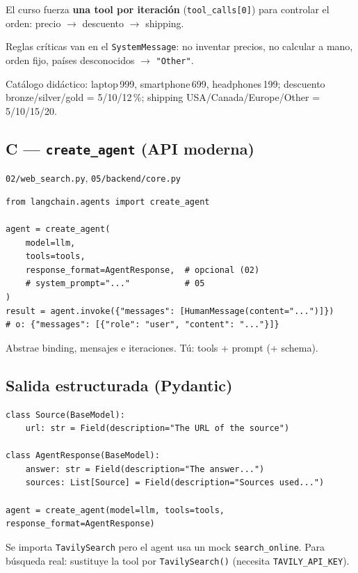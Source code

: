 \documentclass[11pt,a4paper]{article}
\begin{document}
El curso fuerza \textbf{una tool por iteración} (\texttt{tool\_calls[0]}) para controlar el orden: precio $\to$ descuento $\to$ shipping.

Reglas críticas van en el \texttt{SystemMessage}: no inventar precios, no calcular a mano, orden fijo, países desconocidos $\to$ \texttt{"Other"}.

Catálogo didáctico: laptop\,999, smartphone\,699, headphones\,199;
descuento bronze/silver/gold = 5/10/12\,\%;
shipping USA/Canada/Europe/Other = 5/10/15/20.

\subsection{C --- \texttt{create\_agent} (API moderna)}
\texttt{02/web\_search.py}, \texttt{05/backend/core.py}

\begin{lstlisting}
from langchain.agents import create_agent

agent = create_agent(
    model=llm,
    tools=tools,
    response_format=AgentResponse,  # opcional (02)
    # system_prompt="..."           # 05
)
result = agent.invoke({"messages": [HumanMessage(content="...")]})
# o: {"messages": [{"role": "user", "content": "..."}]}
\end{lstlisting}

\begin{concept}[title=create\_agent]
Abstrae binding, mensajes e iteraciones. Tú: tools + prompt (+ schema).
\end{concept}

\subsection{Salida estructurada (Pydantic)}
\begin{lstlisting}
class Source(BaseModel):
    url: str = Field(description="The URL of the source")

class AgentResponse(BaseModel):
    answer: str = Field(description="The answer...")
    sources: List[Source] = Field(description="Sources used...")

agent = create_agent(model=llm, tools=tools, response_format=AgentResponse)
\end{lstlisting}

\begin{tip}[title=Nota sobre 02-web-search-tool]
Se importa \texttt{TavilySearch} pero el agent usa un mock \texttt{search\_online}.
Para búsqueda real: sustituye la tool por \texttt{TavilySearch()} (necesita \texttt{TAVILY\_API\_KEY}).
\end{tip}
\end{document}
